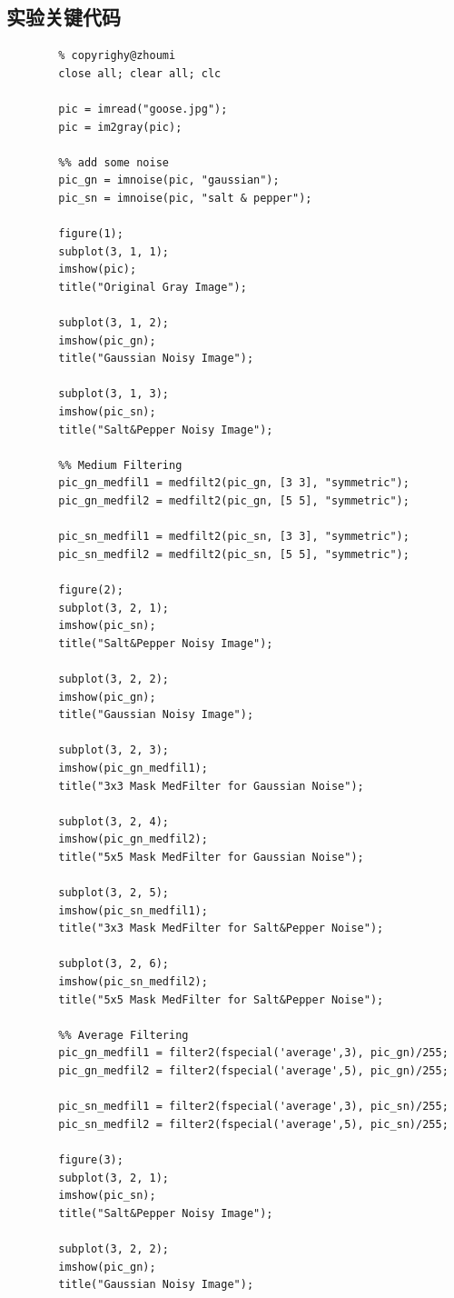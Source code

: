 \documentclass[UTF8]{article} %
\begin{document}
	\subsection{实验关键代码}
	\begin{lstlisting}[style=Matlab-editor]
		% clear 
		% copyrighy@zhoumi
		close all; clear all; clc
		
		pic = imread("goose.jpg");
		pic = im2gray(pic);
		
		%% add some noise
		pic_gn = imnoise(pic, "gaussian");
		pic_sn = imnoise(pic, "salt & pepper");
		
		figure(1);
		subplot(3, 1, 1);
		imshow(pic);
		title("Original Gray Image");
		
		subplot(3, 1, 2);
		imshow(pic_gn);
		title("Gaussian Noisy Image");
		
		subplot(3, 1, 3);
		imshow(pic_sn);
		title("Salt&Pepper Noisy Image");
		
		%% Medium Filtering
		pic_gn_medfil1 = medfilt2(pic_gn, [3 3], "symmetric");
		pic_gn_medfil2 = medfilt2(pic_gn, [5 5], "symmetric");
		
		pic_sn_medfil1 = medfilt2(pic_sn, [3 3], "symmetric");
		pic_sn_medfil2 = medfilt2(pic_sn, [5 5], "symmetric");
		
		figure(2);
		subplot(3, 2, 1);
		imshow(pic_sn);
		title("Salt&Pepper Noisy Image");
		
		subplot(3, 2, 2);
		imshow(pic_gn);
		title("Gaussian Noisy Image");
		
		subplot(3, 2, 3);
		imshow(pic_gn_medfil1);
		title("3x3 Mask MedFilter for Gaussian Noise");
		
		subplot(3, 2, 4);
		imshow(pic_gn_medfil2);
		title("5x5 Mask MedFilter for Gaussian Noise");
		
		subplot(3, 2, 5);
		imshow(pic_sn_medfil1);
		title("3x3 Mask MedFilter for Salt&Pepper Noise");
		
		subplot(3, 2, 6);
		imshow(pic_sn_medfil2);
		title("5x5 Mask MedFilter for Salt&Pepper Noise");
		
		%% Average Filtering
		pic_gn_medfil1 = filter2(fspecial('average',3), pic_gn)/255;
		pic_gn_medfil2 = filter2(fspecial('average',5), pic_gn)/255;
		
		pic_sn_medfil1 = filter2(fspecial('average',3), pic_sn)/255;
		pic_sn_medfil2 = filter2(fspecial('average',5), pic_sn)/255;
		
		figure(3);
		subplot(3, 2, 1);
		imshow(pic_sn);
		title("Salt&Pepper Noisy Image");
		
		subplot(3, 2, 2);
		imshow(pic_gn);
		title("Gaussian Noisy Image");
		

\end{lstlisting}
\end{document}
